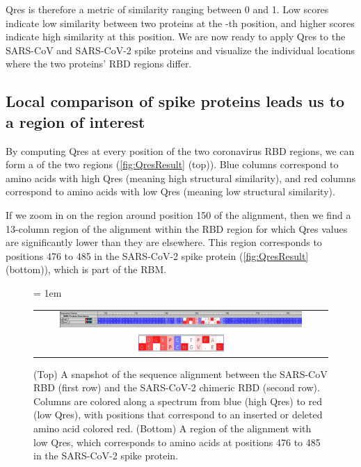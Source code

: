 Qres is therefore a metric of similarity ranging between 0 and 1. Low scores indicate low similarity between two proteins at the -th position, and higher scores indicate high similarity at this position. We are now ready to apply Qres to the SARS-CoV and SARS-CoV-2 spike proteins and visualize the individual locations where the two proteins' RBD regions differ.

\FloatBarrier
{}
\subsection{Local comparison of spike proteins leads us to a region of interest}

By computing Qres at every position of the two coronavirus RBD regions, we can form a  of the two regions (\autoref{fig:QresResult} (top)). Blue columns correspond to amino acids with high Qres (meaning high structural similarity), and red columns correspond to amino acids with low Qres (meaning low structural similarity).

If we zoom in on the region around position 150 of the alignment, then we find a 13-column region of the alignment within the RBD region for which Qres values are significantly lower than they are elsewhere. This region corresponds to positions 476 to 485 in the SARS-CoV-2 spike protein (\autoref{fig:QresResult} (bottom)), which is part of the RBM.\\

\begin{figure}[h]
	\centering
	\tabcolsep = 1em
	\mySfFamily
	\begin{tabular}{c}
		\includegraphics[width = 0.85\textwidth]{../images/QresResult.png} \\
		\includegraphics[width = 0.3\textwidth]{../images/QresResult_cropped.png} \\
	\end{tabular}
	\caption{(Top) A snapshot of the sequence alignment between the SARS-CoV RBD (first row) and the SARS-CoV-2 chimeric RBD (second row). Columns are colored along a spectrum from blue (high Qres) to red (low Qres), with positions that correspond to an inserted or deleted amino acid colored red. (Bottom) A region of the alignment with low Qres, which corresponds to amino acids at positions 476 to 485 in the SARS-CoV-2 spike protein.}
	\label{fig:QresResult}
\end{figure}

